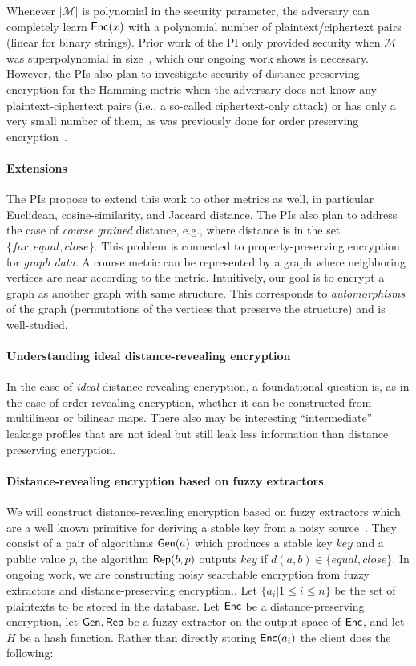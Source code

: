 Whenever $|\mathcal{M}|$ is polynomial in the security parameter, the adversary can completely learn $\mathsf{Enc}(x)$ with a polynomial number of plaintext/ciphertext pairs (linear for binary strings).  Prior work of the PI only provided security when $\mathcal{M}$ was superpolynomial in size~\cite{EPRINT:ABCFG16}, which our ongoing work shows is necessary.  However, the PIs also plan to investigate security of distance-preserving encryption for the Hamming metric when the adversary does not know any plaintext-ciphertext pairs (i.e., a so-called ciphertext-only attack) or has only a very small number of them, as was previously done for order preserving encryption~\cite{C:BolCheOne11}.
 
 \paragraph{Extensions} The PIs propose to extend this work to other metrics as well, in particular Euclidean, cosine-similarity, and Jaccard distance.    The PIs also plan to address the case of \emph{course grained} distance, e.g., where distance is in the set $\{far, equal, close\}$.  This problem is connected to property-preserving encryption for \emph{graph data}.  A course metric can be represented by a graph where neighboring vertices are near according to the metric.  Intuitively, our goal is to encrypt a graph as another graph with same structure.  This corresponds to \emph{automorphisms} of the graph (permutations of the vertices that preserve the structure) and is well-studied.

\paragraph{Understanding ideal distance-revealing encryption}
In the case of \emph{ideal} distance-revealing encryption, a foundational question is, as in the case of order-revealing encryption, whether it can be constructed from multilinear or bilinear maps.  There also may be interesting ``intermediate'' leakage profiles that are not ideal but still leak less information than distance preserving encryption. 

\paragraph{Distance-revealing encryption based on fuzzy extractors}
We will construct distance-revealing encryption based on fuzzy extractors which are a well known primitive for deriving a stable key from a noisy source~\cite{EC:DodReySmi04}.  They consist of a pair of algorithms $\mathsf{Gen}(a)$ which produces a stable key $key$ and a public value $p$, the algorithm $\mathsf{Rep}(b, p)$ outputs $key$ if $d(a,b)\in\{equal,close\}$.  In ongoing work, we are constructing noisy searchable encryption from fuzzy extractors and distance-preserving encryption..  Let $\{a_i | 1\le i \le n\}$ be the set of plaintexts to be stored in the database.  Let $\mathsf{Enc}$ be a distance-preserving encryption, let $\mathsf{Gen}, \mathsf{Rep}$ be a fuzzy extractor on the output space of $\mathsf{Enc}$, and let $H$ be a hash function.  Rather than directly storing $\mathsf{Enc}(a_i)$ the client does the following:

